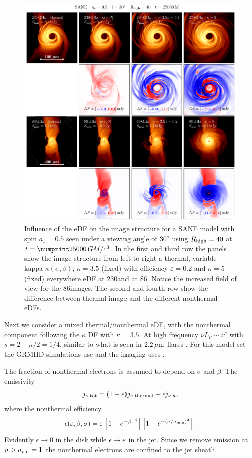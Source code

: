 \begin{figure}
  \centering
  \includegraphics[width=\textwidth]{./figures/SANE_eDFs_diff.pdf}
  \caption{Influence of the eDF on the image structure for a SANE model with spin $a_{\star}=0.5$ seen under a viewing angle of $30\degree$ using $R_\mathrm{high} = 40$ at $t = \no{25000}\,\tg$.
    In the first and third row the panels show the image structure from left to right a thermal, variable kappa $\kappa(\sigma,\beta)$, $\kappa=3.5$ (fixed) with efficiency $\varepsilon=0.2$ and $\kappa=5$ (fixed) everywhere eDF at 230\GHz and at 86\GHz.
    Notice the increased field of view for the 86\GHz images.
    The second and fourth row show the difference between thermal image and the different nonthermal eDFs.}
  \label{fig:SANE_edfs}
\end{figure}

Next we consider a mixed thermal/nonthermal eDF, with the nonthermal component following the $\kappa$ DF with $\kappa = 3.5$.
At high frequency $\nu L_\nu \sim \nu^s$ with $s = 2 - \kappa/2 = 1/4$, similar to what is seen in $2.2\,\mu\mathrm{m}$ flares \citep{2007ApJ...667..900H}.
For this model set the GRMHD simulations use \bhac and the imaging uses \bhoss.

The fraction of nonthermal electrons is assumed to depend on $\sigma$ and $\beta$.  The emissivity
\begin{equation}
  j_{\nu,\rm{tot}}=(1-\epsilon) j_{\nu,\rm{thermal}} + \epsilon j_{\nu, \kappa},
  \label{eq:kappaeff}
\end{equation}
where the nonthermal efficiency 
\begin{equation}
  \epsilon(\varepsilon,\beta,\sigma)=\varepsilon\,
  \left[1 - e^{-\beta^{-2}}\right]
  \left[1-e^{-(\sigma/\sigma_{\rm min})^2}\right].
  \label{eq:efficiencybetasigma}
\end{equation}
Evidently $\epsilon \rightarrow 0$ in the disk while $\epsilon \rightarrow \varepsilon$ in the jet.
Since we remove emission at $\sigma > \sigma_{\rm cut} = 1$ the nonthermal electrons are confined to the jet sheath.

